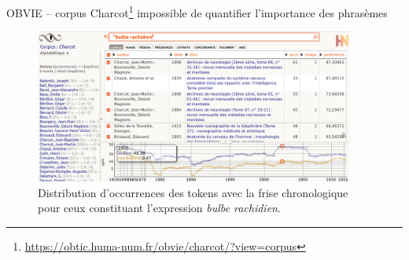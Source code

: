 %
\begin{frame}{OBVIE -- corpus Charcot\footnote{\url{https://obtic.huma-num.fr/obvie/charcot/?view=corpus}}}
\danger{} impossible de quantifier l'importance des phrasèmes
\begin{figure}[!h]
    \centering
\includegraphics[width=105mm,scale=0.5]{pic/bulbe_rachidien.png}
    \caption{Distribution d'occurrences des tokens avec la frise chronologique pour ceux constituant l'expression \textit{bulbe rachidien}.}
    \label{fig:my_label}
\end{figure}
\end{frame}

